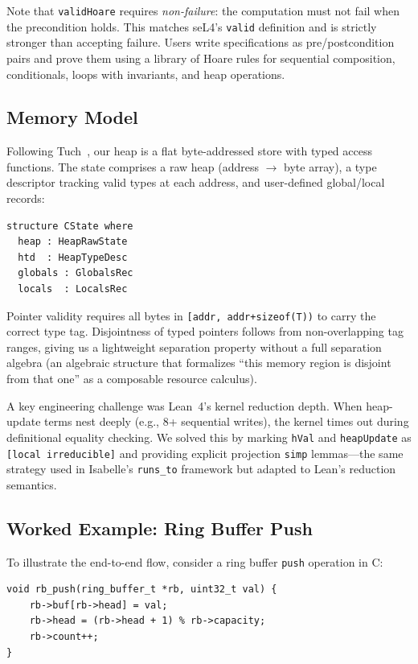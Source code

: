 \documentclass[sigconf,nonacm,screen]{acmart}
\begin{document}
\noindent Note that \texttt{validHoare} requires \emph{non-failure}: the computation
must not fail when the precondition holds. This matches seL4's
\texttt{valid} definition and is strictly stronger than accepting failure.
Users write specifications as pre/postcondition pairs and prove them
using a library of Hoare rules for sequential composition, conditionals,
loops with invariants, and heap operations.

\subsection{Memory Model}
\label{sec:memory}

Following Tuch~\cite{tuch2009types}, our heap is a flat
byte-addressed store with typed access functions. The state
comprises a raw heap (address $\to$ byte array), a type
descriptor tracking valid types at each address, and
user-defined global/local records:

\begin{lstlisting}[language=Lean]
structure CState where
  heap : HeapRawState
  htd  : HeapTypeDesc
  globals : GlobalsRec
  locals  : LocalsRec
\end{lstlisting}

Pointer validity requires all bytes in
\texttt{[addr,~addr+sizeof(T))} to carry the correct type tag. Disjointness of typed pointers follows from
non-overlapping tag ranges, giving us a lightweight separation property
without a full separation algebra (an algebraic structure that
formalizes ``this memory region is disjoint from that one'' as a
composable resource calculus).

A key engineering challenge was Lean~4's kernel reduction depth. When
heap-update terms nest deeply (e.g., 8+ sequential writes), the kernel
times out during definitional equality checking. We solved this by
marking \texttt{hVal} and \texttt{heapUpdate} as
\texttt{[local irreducible]} and providing explicit projection
\texttt{simp} lemmas---the same strategy used in Isabelle's
\texttt{runs\_to} framework but adapted to Lean's reduction semantics.

\subsection{Worked Example: Ring Buffer Push}

To illustrate the end-to-end flow,
consider a ring buffer \texttt{push} operation in C:

\begin{lstlisting}[language=CSubset]
void rb_push(ring_buffer_t *rb, uint32_t val) {
    rb->buf[rb->head] = val;
    rb->head = (rb->head + 1) % rb->capacity;
    rb->count++;
}
\end{lstlisting}
\end{document}
